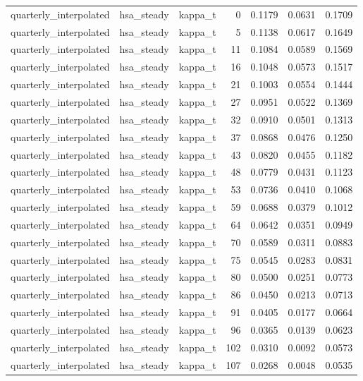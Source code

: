 \begin{tabular}{lllrrrr}
quarterly\_interpolated & hsa\_steady & kappa\_t & 0 & 0.1179 & 0.0631 & 0.1709 \\
quarterly\_interpolated & hsa\_steady & kappa\_t & 5 & 0.1138 & 0.0617 & 0.1649 \\
quarterly\_interpolated & hsa\_steady & kappa\_t & 11 & 0.1084 & 0.0589 & 0.1569 \\
quarterly\_interpolated & hsa\_steady & kappa\_t & 16 & 0.1048 & 0.0573 & 0.1517 \\
quarterly\_interpolated & hsa\_steady & kappa\_t & 21 & 0.1003 & 0.0554 & 0.1444 \\
quarterly\_interpolated & hsa\_steady & kappa\_t & 27 & 0.0951 & 0.0522 & 0.1369 \\
quarterly\_interpolated & hsa\_steady & kappa\_t & 32 & 0.0910 & 0.0501 & 0.1313 \\
quarterly\_interpolated & hsa\_steady & kappa\_t & 37 & 0.0868 & 0.0476 & 0.1250 \\
quarterly\_interpolated & hsa\_steady & kappa\_t & 43 & 0.0820 & 0.0455 & 0.1182 \\
quarterly\_interpolated & hsa\_steady & kappa\_t & 48 & 0.0779 & 0.0431 & 0.1123 \\
quarterly\_interpolated & hsa\_steady & kappa\_t & 53 & 0.0736 & 0.0410 & 0.1068 \\
quarterly\_interpolated & hsa\_steady & kappa\_t & 59 & 0.0688 & 0.0379 & 0.1012 \\
quarterly\_interpolated & hsa\_steady & kappa\_t & 64 & 0.0642 & 0.0351 & 0.0949 \\
quarterly\_interpolated & hsa\_steady & kappa\_t & 70 & 0.0589 & 0.0311 & 0.0883 \\
quarterly\_interpolated & hsa\_steady & kappa\_t & 75 & 0.0545 & 0.0283 & 0.0831 \\
quarterly\_interpolated & hsa\_steady & kappa\_t & 80 & 0.0500 & 0.0251 & 0.0773 \\
quarterly\_interpolated & hsa\_steady & kappa\_t & 86 & 0.0450 & 0.0213 & 0.0713 \\
quarterly\_interpolated & hsa\_steady & kappa\_t & 91 & 0.0405 & 0.0177 & 0.0664 \\
quarterly\_interpolated & hsa\_steady & kappa\_t & 96 & 0.0365 & 0.0139 & 0.0623 \\
quarterly\_interpolated & hsa\_steady & kappa\_t & 102 & 0.0310 & 0.0092 & 0.0573 \\
quarterly\_interpolated & hsa\_steady & kappa\_t & 107 & 0.0268 & 0.0048 & 0.0535 \\

\end{tabular}

